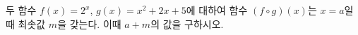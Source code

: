 두 함수 $f(x)=2^x$, $g(x)=x^2+2x+5$에 대하여 함수 $(f\circ g)(x)$는 $x=a$일 때 최솟값 $m$을 갖는다. 이때 $a+m$의 값을 구하시오.
